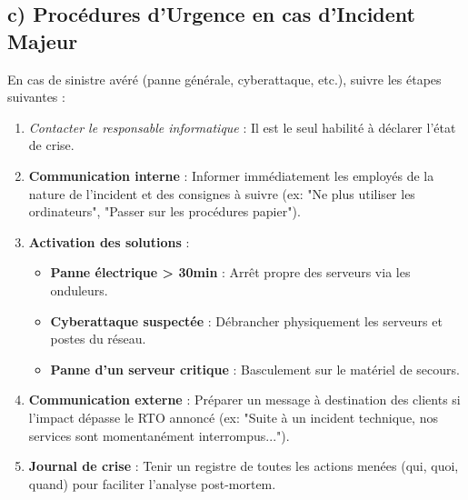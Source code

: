 \documentclass[a4paper,10pt]{article}
\newcommand{\notion}[1]{\textbf{\textcolor{mainBlue}{#1}}}
\newcommand{\important}[1]{\textit{\textcolor{alertRed}{#1}}}
\begin{document}
\begin{tcolorbox}[title=5) Synthèse : Mini Plan de Continuité d'Activité (PCA)]
    \subsection*{c) Procédures d'Urgence en cas d'Incident Majeur}
    En cas de sinistre avéré (panne générale, cyberattaque, etc.), suivre les étapes suivantes :
    \begin{enumerate}[leftmargin=*]
        \item \important{Contacter le responsable informatique} : Il est le seul habilité à déclarer l'état de crise.
        \item \notion{Communication interne} : Informer immédiatement les employés de la nature de l'incident et des consignes à suivre (ex: "Ne plus utiliser les ordinateurs", "Passer sur les procédures papier").
        \item \notion{Activation des solutions} :
            \begin{itemize}
                \item \textbf{Panne électrique > 30min} : Arrêt propre des serveurs via les onduleurs.
                \item \textbf{Cyberattaque suspectée} : Débrancher physiquement les serveurs et postes du réseau.
                \item \textbf{Panne d'un serveur critique} : Basculement sur le matériel de secours.
            \end{itemize}
        \item \notion{Communication externe} : Préparer un message à destination des clients si l'impact dépasse le RTO annoncé (ex: "Suite à un incident technique, nos services sont momentanément interrompus...").
        \item \notion{Journal de crise} : Tenir un registre de toutes les actions menées (qui, quoi, quand) pour faciliter l'analyse post-mortem.
    \end{enumerate}
\end{tcolorbox}
\end{document}
